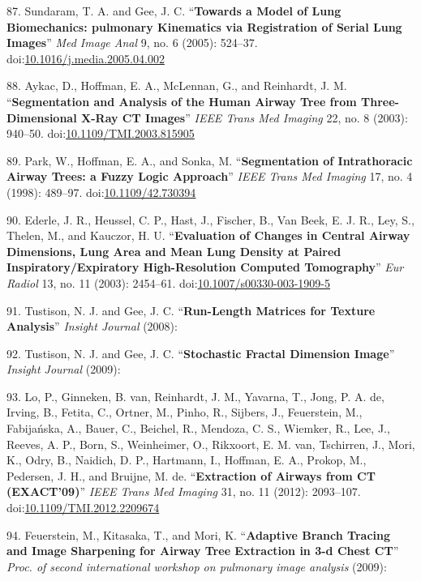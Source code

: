 \documentclass[11pt,]{article}
\begin{document}
87. Sundaram, T. A. and Gee, J. C. ``\textbf{Towards a Model of Lung
Biomechanics: pulmonary Kinematics via Registration of Serial Lung
Images}'' \emph{Med Image Anal} 9, no. 6 (2005): 524--37.
doi:\href{http://dx.doi.org/10.1016/j.media.2005.04.002}{10.1016/j.media.2005.04.002}

88. Aykac, D., Hoffman, E. A., McLennan, G., and Reinhardt, J. M.
``\textbf{Segmentation and Analysis of the Human Airway Tree from
Three-Dimensional X-Ray CT Images}'' \emph{IEEE Trans Med Imaging} 22,
no. 8 (2003): 940--50.
doi:\href{http://dx.doi.org/10.1109/TMI.2003.815905}{10.1109/TMI.2003.815905}

89. Park, W., Hoffman, E. A., and Sonka, M. ``\textbf{Segmentation of
Intrathoracic Airway Trees: a Fuzzy Logic Approach}'' \emph{IEEE Trans
Med Imaging} 17, no. 4 (1998): 489--97.
doi:\href{http://dx.doi.org/10.1109/42.730394}{10.1109/42.730394}

90. Ederle, J. R., Heussel, C. P., Hast, J., Fischer, B., Van Beek, E.
J. R., Ley, S., Thelen, M., and Kauczor, H. U. ``\textbf{Evaluation of
Changes in Central Airway Dimensions, Lung Area and Mean Lung Density at
Paired Inspiratory/Expiratory High-Resolution Computed Tomography}''
\emph{Eur Radiol} 13, no. 11 (2003): 2454--61.
doi:\href{http://dx.doi.org/10.1007/s00330-003-1909-5}{10.1007/s00330-003-1909-5}

91. Tustison, N. J. and Gee, J. C. ``\textbf{Run-Length Matrices for
Texture Analysis}'' \emph{Insight Journal} (2008):

92. Tustison, N. J. and Gee, J. C. ``\textbf{Stochastic Fractal
Dimension Image}'' \emph{Insight Journal} (2009):

93. Lo, P., Ginneken, B. van, Reinhardt, J. M., Yavarna, T., Jong, P. A.
de, Irving, B., Fetita, C., Ortner, M., Pinho, R., Sijbers, J.,
Feuerstein, M., Fabija{ń}ska, A., Bauer, C., Beichel, R., Mendoza, C.
S., Wiemker, R., Lee, J., Reeves, A. P., Born, S., Weinheimer, O.,
Rikxoort, E. M. van, Tschirren, J., Mori, K., Odry, B., Naidich, D. P.,
Hartmann, I., Hoffman, E. A., Prokop, M., Pedersen, J. H., and Bruijne,
M. de. ``\textbf{Extraction of Airways from CT (EXACT'09)}'' \emph{IEEE
Trans Med Imaging} 31, no. 11 (2012): 2093--107.
doi:\href{http://dx.doi.org/10.1109/TMI.2012.2209674}{10.1109/TMI.2012.2209674}

94. Feuerstein, M., Kitasaka, T., and Mori, K. ``\textbf{Adaptive Branch
Tracing and Image Sharpening for Airway Tree Extraction in 3-d Chest
CT}'' \emph{Proc. of second international workshop on pulmonary image
analysis} (2009):
\end{document}
